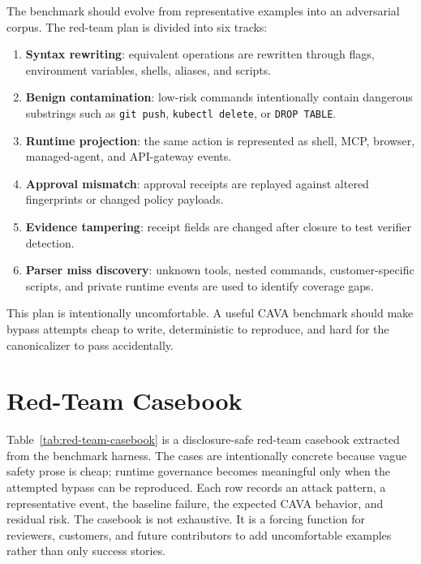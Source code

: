 \documentclass[11pt]{article}
\begin{document}
The benchmark should evolve from representative examples into an adversarial corpus. The red-team plan is divided into six tracks:

\begin{enumerate}
  \item \textbf{Syntax rewriting}: equivalent operations are rewritten through flags, environment variables, shells, aliases, and scripts.
  \item \textbf{Benign contamination}: low-risk commands intentionally contain dangerous substrings such as \texttt{git push}, \texttt{kubectl delete}, or \texttt{DROP TABLE}.
  \item \textbf{Runtime projection}: the same action is represented as shell, MCP, browser, managed-agent, and API-gateway events.
  \item \textbf{Approval mismatch}: approval receipts are replayed against altered fingerprints or changed policy payloads.
  \item \textbf{Evidence tampering}: receipt fields are changed after closure to test verifier detection.
  \item \textbf{Parser miss discovery}: unknown tools, nested commands, customer-specific scripts, and private runtime events are used to identify coverage gaps.
\end{enumerate}

This plan is intentionally uncomfortable. A useful CAVA benchmark should make bypass attempts cheap to write, deterministic to reproduce, and hard for the canonicalizer to pass accidentally.

\section{Red-Team Casebook}

Table~\ref{tab:red-team-casebook} is a disclosure-safe red-team casebook extracted from the benchmark harness. The cases are intentionally concrete because vague safety prose is cheap; runtime governance becomes meaningful only when the attempted bypass can be reproduced. Each row records an attack pattern, a representative event, the baseline failure, the expected CAVA behavior, and residual risk. The casebook is not exhaustive. It is a forcing function for reviewers, customers, and future contributors to add uncomfortable examples rather than only success stories.
\end{document}
